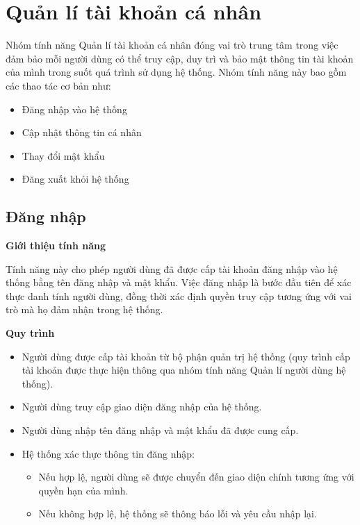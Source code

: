 \section{Quản lí tài khoản cá nhân}

Nhóm tính năng Quản lí tài khoản cá nhân đóng vai trò trung tâm trong việc đảm bảo mỗi người dùng có thể truy cập, duy trì và bảo mật thông tin tài khoản của mình trong suốt quá trình sử dụng hệ thống. Nhóm tính năng này bao gồm các thao tác cơ bản như:
\begin{itemize}
    \item Đăng nhập vào hệ thống
    \item Cập nhật thông tin cá nhân
    \item Thay đổi mật khẩu
    \item Đăng xuất khỏi hệ thống
\end{itemize}

\subsection{Đăng nhập}

\noindent \textbf{Giới thiệu tính năng}

Tính năng này cho phép người dùng đã được cấp tài khoản đăng nhập vào hệ thống bằng tên đăng nhập và mật khẩu. Việc đăng nhập là bước đầu tiên để xác thực danh tính người dùng, đồng thời xác định quyền truy cập tương ứng với vai trò mà họ đảm nhận trong hệ thống.

\noindent \textbf{Quy trình}

\begin{itemize}

\item Người dùng được cấp tài khoản từ bộ phận quản trị hệ thống (quy trình cấp tài khoản được thực hiện thông qua nhóm tính năng Quản lí người dùng hệ thống).

\item Người dùng truy cập giao diện đăng nhập của hệ thống.

\item Người dùng nhập tên đăng nhập và mật khẩu đã được cung cấp.

\item Hệ thống xác thực thông tin đăng nhập:
    \begin{itemize}
        \item Nếu hợp lệ, người dùng sẽ được chuyển đến giao diện chính tương ứng với quyền hạn của mình.
        \item Nếu không hợp lệ, hệ thống sẽ thông báo lỗi và yêu cầu nhập lại.
    \end{itemize}

\end{itemize}

